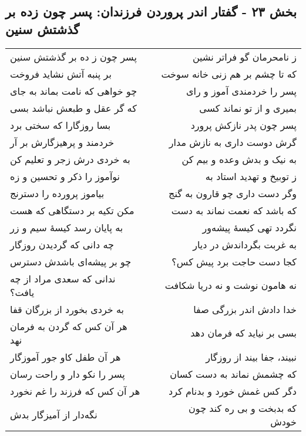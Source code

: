 \begin{center}
\section*{بخش ۲۳ - گفتار اندر پروردن فرزندان: پسر چون زده بر گذشتش سنین}
\label{sec:023}
\begin{longtable}{l p{0.5cm} r}
پسر چون ز ده بر گذشتش سنین
&&
ز نامحرمان گو فراتر نشین
\\
بر پنبه آتش نشاید فروخت
&&
که تا چشم بر هم زنی خانه سوخت
\\
چو خواهی که نامت بماند به جای
&&
پسر را خردمندی آموز و رای
\\
که گر عقل و طبعش نباشد بسی
&&
بمیری و از تو نماند کسی
\\
بسا روزگارا که سختی برد
&&
پسر چون پدر نازکش پرورد
\\
خردمند و پرهیزگارش بر آر
&&
گرش دوست داری به نازش مدار
\\
به خردی درش زجر و تعلیم کن
&&
به نیک و بدش وعده و بیم کن
\\
نوآموز را ذکر و تحسین و زه
&&
ز توبیخ و تهدید استاد به
\\
بیاموز پرورده را دسترنج
&&
وگر دست داری چو قارون به گنج
\\
مکن تکیه بر دستگاهی که هست
&&
که باشد که نعمت نماند به دست
\\
به پایان رسد کیسهٔ سیم و زر
&&
نگردد تهی کیسهٔ پیشه‌ور
\\
چه دانی که گردیدن روزگار
&&
به غربت بگرداندش در دیار
\\
چو بر پیشه‌ای باشدش دسترس
&&
کجا دست حاجت برد پیش کس؟
\\
ندانی که سعدی مراد از چه یافت؟
&&
نه هامون نوشت و نه دریا شکافت
\\
به خردی بخورد از بزرگان قفا
&&
خدا دادش اندر بزرگی صفا
\\
هر آن کس که گردن به فرمان نهد
&&
بسی بر نیاید که فرمان دهد
\\
هر آن طفل کاو جور آموزگار
&&
نبیند، جفا بیند از روزگار
\\
پسر را نکو دار و راحت رسان
&&
که چشمش نماند به دست کسان
\\
هر آن کس که فرزند را غم نخورد
&&
دگر کس غمش خورد و بدنام کرد
\\
نگه‌دار از آمیزگار بدش
&&
که بدبخت و بی ره کند چون خودش
\\
\end{longtable}
\end{center}
